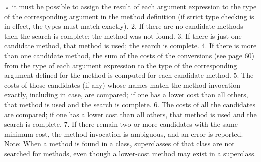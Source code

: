 ◦ it must be possible to assign the result of each argument expression to the type of the corresponding argument in the method definition (if strict type checking is in effect, the types must match exactly).
2. If there are no candidate methods then the search is complete; the method was not found.
3. If there is just one candidate method, that method is used; the search is complete.
4. If there is more than one candidate method, the sum of the costs of the conversions (see page 60) from the type of each argument expression to the type of the corresponding argument defined for the method is computed for each candidate method.
5. The costs of those candidates (if any) whose names match the method invocation exactly, including in case, are compared; if one has a lower cost than all others, that method is used and the search is complete.
6. The costs of all the candidates are compared; if one has a lower cost than all others, that method is used and the search is complete.
7. If there remain two or more candidates with the same minimum cost, the method invocation is ambiguous, and an error is reported.
Note: When a method is found in a class, superclasses of that class are not searched for methods, even though a lower-cost method may exist in a superclass.
